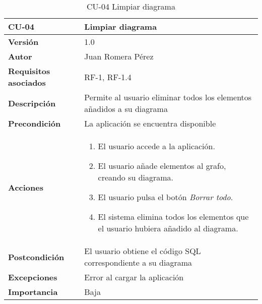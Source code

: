 \begin{table}[p]
    \centering
    \begin{tabularx}{\linewidth}{ p{} p{}}
		\toprule
		\textbf{CU-04}    & \textbf{Limpiar diagrama}\\
		\toprule
		\textbf{Versión}              & 1.0    \\
		\textbf{Autor}                & Juan Romera Pérez \\
		\textbf{Requisitos asociados} & RF-1, RF-1.4 \\
		\textbf{Descripción}          & Permite al usuario eliminar todos los elementos añadidos a su diagrama \\
		\textbf{Precondición}         & La aplicación se encuentra disponible \\
		\textbf{Acciones}             &
		\begin{enumerate}
			\def\labelenumi{\arabic{enumi}.}
			\tightlist
			\item El usuario accede a la aplicación.
			\item El usuario añade elementos al grafo, creando su diagrama.
            \item El usuario pulsa el botón \emph{Borrar todo}.
            \item El sistema elimina todos los elementos que el usuario hubiera añadido al diagrama.
		\end{enumerate}\\
		\textbf{Postcondición}        & El usuario obtiene el código SQL correspondiente a su diagrama \\
		\textbf{Excepciones}          & Error al cargar la aplicación \\
		\textbf{Importancia}          & Baja \\
		\bottomrule
    \end{tabularx}
    \caption{CU-04 Limpiar diagrama}
\end{table}

